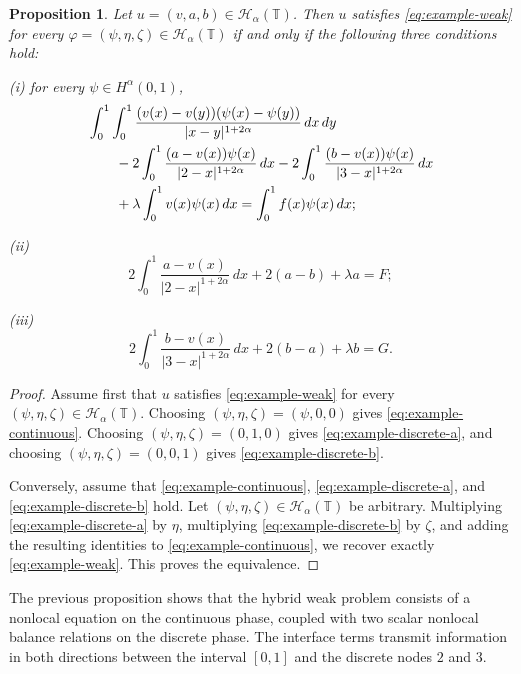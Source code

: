 \documentclass[11pt]{article}
\numberwithin{equation}{section}
\newtheorem{proposition}[theorem]{Proposition}
\theoremstyle{definition}
\begin{document}
\begin{proposition}\label{prop:example-splitting}
Let $u=(v,a,b)\in\mathcal H_\alpha(\mathbb T)$. Then $u$ satisfies \eqref{eq:example-weak} for every $\varphi=(\psi,\eta,\zeta)\in\mathcal H_\alpha(\mathbb T)$ if and only if the following three conditions hold:

\medskip
\noindent
\textup{(i)} for every $\psi\in H^\alpha(0,1)$,
\begin{align}
&\int_0^1\int_0^1
\frac{(v(x)-v(y))(\psi(x)-\psi(y))}{|x-y|^{1+2\alpha}}\,dx\,dy
\notag\\
&\qquad
-2\int_0^1\frac{(a-v(x))\psi(x)}{|2-x|^{1+2\alpha}}\,dx
-2\int_0^1\frac{(b-v(x))\psi(x)}{|3-x|^{1+2\alpha}}\,dx
\notag\\
&\qquad
+\lambda\int_0^1 v(x)\psi(x)\,dx
=
\int_0^1 f(x)\psi(x)\,dx;
\label{eq:example-continuous}
\end{align}

\medskip
\noindent
\textup{(ii)}
\begin{equation}\label{eq:example-discrete-a}
2\int_0^1\frac{a-v(x)}{|2-x|^{1+2\alpha}}\,dx
+2(a-b)+\lambda a
=
F;
\end{equation}

\medskip
\noindent
\textup{(iii)}
\begin{equation}\label{eq:example-discrete-b}
2\int_0^1\frac{b-v(x)}{|3-x|^{1+2\alpha}}\,dx
+2(b-a)+\lambda b
=
G.
\end{equation}
\end{proposition}

\begin{proof}
Assume first that $u$ satisfies \eqref{eq:example-weak} for every $(\psi,\eta,\zeta)\in\mathcal H_\alpha(\mathbb T)$. Choosing $(\psi,\eta,\zeta)=(\psi,0,0)$ gives \eqref{eq:example-continuous}. Choosing $(\psi,\eta,\zeta)=(0,1,0)$ gives \eqref{eq:example-discrete-a}, and choosing $(\psi,\eta,\zeta)=(0,0,1)$ gives \eqref{eq:example-discrete-b}.

Conversely, assume that \eqref{eq:example-continuous}, \eqref{eq:example-discrete-a}, and \eqref{eq:example-discrete-b} hold. Let $(\psi,\eta,\zeta)\in\mathcal H_\alpha(\mathbb T)$ be arbitrary. Multiplying \eqref{eq:example-discrete-a} by $\eta$, multiplying \eqref{eq:example-discrete-b} by $\zeta$, and adding the resulting identities to \eqref{eq:example-continuous}, we recover exactly \eqref{eq:example-weak}. This proves the equivalence.
\end{proof}

The previous proposition shows that the hybrid weak problem consists of a nonlocal equation on the continuous phase, coupled with two scalar nonlocal balance relations on the discrete phase. The interface terms transmit information in both directions between the interval $[0,1]$ and the discrete nodes $2$ and $3$.
\end{document}
